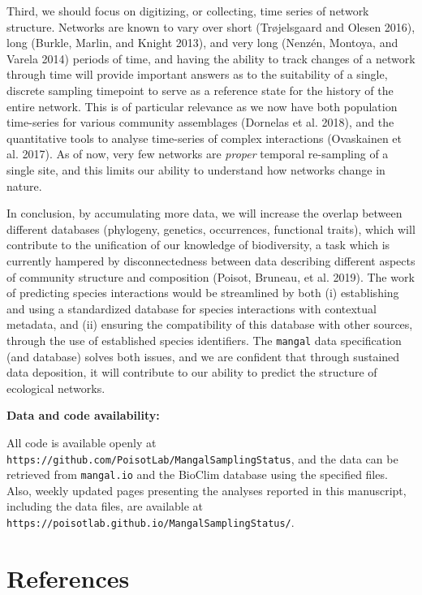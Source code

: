 \documentclass[11pt]{article}
\begin{document}
Third, we should focus on digitizing, or collecting, time series of
network structure. Networks are known to vary over short (Trøjelsgaard
and Olesen 2016), long (Burkle, Marlin, and Knight 2013), and very long
(Nenzén, Montoya, and Varela 2014) periods of time, and having the
ability to track changes of a network through time will provide
important answers as to the suitability of a single, discrete sampling
timepoint to serve as a reference state for the history of the entire
network. This is of particular relevance as we now have both population
time-series for various community assemblages (Dornelas et al. 2018),
and the quantitative tools to analyse time-series of complex
interactions (Ovaskainen et al. 2017). As of now, very few networks are
\emph{proper} temporal re-sampling of a single site, and this limits our
ability to understand how networks change in nature.

In conclusion, by accumulating more data, we will increase the overlap
between different databases (phylogeny, genetics, occurrences,
functional traits), which will contribute to the unification of our
knowledge of biodiversity, a task which is currently hampered by
disconnectedness between data describing different aspects of community
structure and composition (Poisot, Bruneau, et al. 2019). The work of
predicting species interactions would be streamlined by both (i)
establishing and using a standardized database for species interactions
with contextual metadata, and (ii) ensuring the compatibility of this
database with other sources, through the use of established species
identifiers. The \texttt{mangal} data specification (and database)
solves both issues, and we are confident that through sustained data
deposition, it will contribute to our ability to predict the structure
of ecological networks.

\textbf{Data and code availability:}

All code is available openly at
\texttt{https://github.com/PoisotLab/MangalSamplingStatus}, and the data
can be retrieved from \texttt{mangal.io} and the BioClim database using
the specified files. Also, weekly updated pages presenting the analyses
reported in this manuscript, including the data files, are available at
\texttt{https://poisotlab.github.io/MangalSamplingStatus/}.

\hypertarget{references}{%
\section*{References}\label{references}}
\end{document}
